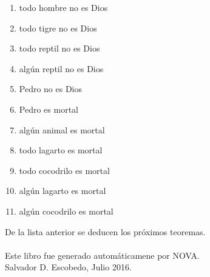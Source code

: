 ﻿\documentclass[12pt]{book}
\begin{document}
\begin{enumerate}
\item todo hombre no es Dios
\item todo tigre no es Dios
\item todo reptil no es Dios
\item algún reptil no es Dios
\item Pedro no es Dios
\item Pedro es mortal
\item algún animal es mortal
\item todo lagarto es mortal
\item todo cocodrilo es mortal
\item algún lagarto es mortal
\item algún cocodrilo es mortal
\end{enumerate}De la lista anterior se deducen los próximos teoremas. \\

\\\small{Este libro fue generado automáticamene por NOVA.} \\
\small{Salvador D. Escobedo, Julio 2016}.
\end{document}
